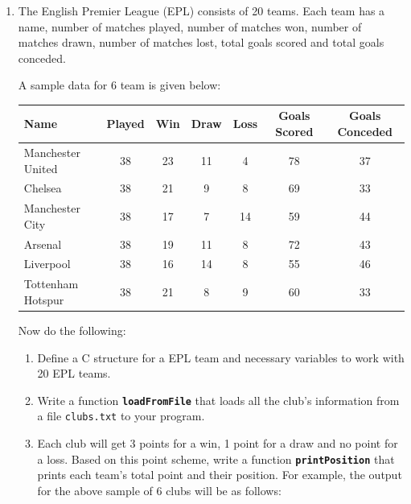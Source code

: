 \documentclass[12pt,a3paper]{article}
\newcommand{\yr}[1]{\hfill\textcolor{gray}{\small\textbf{[#1]}}}
\newcommand{\mk}[1]{\textcolor{orange!70!black}{\small\textbf{(#1 marks)}}}
\begin{document}
\begin{enumerate}
\begin{lstlisting}
struct A { char a; float d; char c; };
struct B { char a; char c; float d; };
\end{lstlisting}
\mk{5} \yr{CSE 101 | L-1/T-1 | 2018--19}

\item The English Premier League (EPL) consists of 20 teams. Each team has a name,
    number of matches played, number of matches won, number of matches drawn, number
    of matches lost, total goals scored and total goals conceded.

    A sample data for 6 team is given below:

    \begin{center}
    \begin{tabular}{|l|c|c|c|c|c|c|}
    \hline
    \textbf{Name} & \textbf{Played} & \textbf{Win} & \textbf{Draw} & \textbf{Loss} & \textbf{Goals Scored} & \textbf{Goals Conceded} \\
    \hline
    Manchester United & 38 & 23 & 11 & 4  & 78 & 37 \\
    \hline
    Chelsea           & 38 & 21 & 9  & 8  & 69 & 33 \\
    \hline
    Manchester City   & 38 & 17 & 7  & 14 & 59 & 44 \\
    \hline
    Arsenal           & 38 & 19 & 11 & 8  & 72 & 43 \\
    \hline
    Liverpool         & 38 & 16 & 14 & 8  & 55 & 46 \\
    \hline
    Tottenham Hotspur & 38 & 21 & 8  & 9  & 60 & 33 \\
    \hline
    \end{tabular}
    \end{center}

    Now do the following:

    \begin{enumerate}
        \item[(i)] Define a C structure for a EPL team and necessary variables to work with 20 EPL
        teams.

        \item[(ii)] Write a function \texttt{\textbf{loadFromFile}} that loads all the club's information from a file
        \texttt{clubs.txt} to your program.

        \item[(iii)] Each club will get 3 points for a win, 1 point for a draw and no point for a loss.
        Based on this point scheme, write a function \texttt{\textbf{printPosition}} that prints each team's
        total point and their position. For example, the output for the above sample of 6 clubs
        will be as follows:


\end{enumerate}
\end{enumerate}
\end{document}
